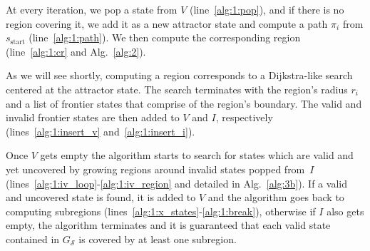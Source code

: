 \documentclass[letterpaper]{article} %
\newcommand{\calS}{\ensuremath{\mathcal{S}}\xspace}
\newcommand{\sStart}{\ensuremath{s_{\text{start}}\xspace}}
\begin{document}
At every iteration, we pop a state from $V$ (line~\ref{alg:1:pop}), and if there is no region covering it, we add it as a new attractor state and compute a path $\pi_i$ from $\sStart$ (line~\ref{alg:1:path}).
We then compute the corresponding region (line~\ref{alg:1:cr} and Alg.~\ref{alg:2}).

As we will see shortly, computing a region corresponds to a Dijkstra-like search centered at the attractor state.
The search terminates with the region's radius $r_i$ and a list of frontier states that comprise of the region's boundary.
The valid and invalid frontier states are then added to $V$ and $I$, respectively (lines~\ref{alg:1:insert_v} and~\ref{alg:1:insert_i}).


Once $V$ gets empty the algorithm starts to search for states which are valid and yet uncovered by growing regions around invalid states popped from~$I$ (lines~\ref{alg:1:iv_loop}-\ref{alg:1:iv_region} and detailed in Alg.~\ref{alg:3b}). If a valid and uncovered state is found, it is added to $V$ and the algorithm goes back to computing subregions (lines~\ref{alg:1:x_states}-\ref{alg:1:break}), otherwise if $I$ also gets empty, the algorithm terminates and it is guaranteed that each valid state contained in $G_\calS$ is covered by at least one subregion.
\end{document}
